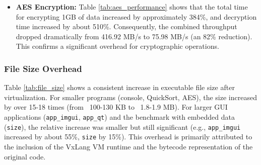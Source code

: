 \begin{itemize}
    \item \textbf{AES Encryption:} Table \ref{tab:aes_performance} shows that the total time for encrypting 1GB of data increased by approximately 384\%, and decryption time increased by about 510\%. Consequently, the combined throughput dropped dramatically from 416.92 MB/s to 75.98 MB/s (an 82\% reduction). This confirms a significant overhead for cryptographic operations.
    \begin{table}[!t]
      \centering
      \caption{AES-256-CBC Performance Results (1GB Data)}
      \label{tab:aes_performance}
    \end{table}

\end{itemize}

\subsubsection{File Size Overhead}
Table \ref{tab:file_size} shows a consistent increase in executable file size after virtualization. For smaller programs (console, QuickSort, AES), the size increased by over 15-18 times (from ~100-130 KB to ~1.8-1.9 MB). For larger GUI applications (\texttt{app\_imgui}, \texttt{app\_qt}) and the benchmark with embedded data (\texttt{size}), the relative increase was smaller but still significant (e.g., \texttt{app\_imgui} increased by about 55\%, \texttt{size} by 15\%). This overhead is primarily attributed to the inclusion of the VxLang VM runtime and the bytecode representation of the original code.

